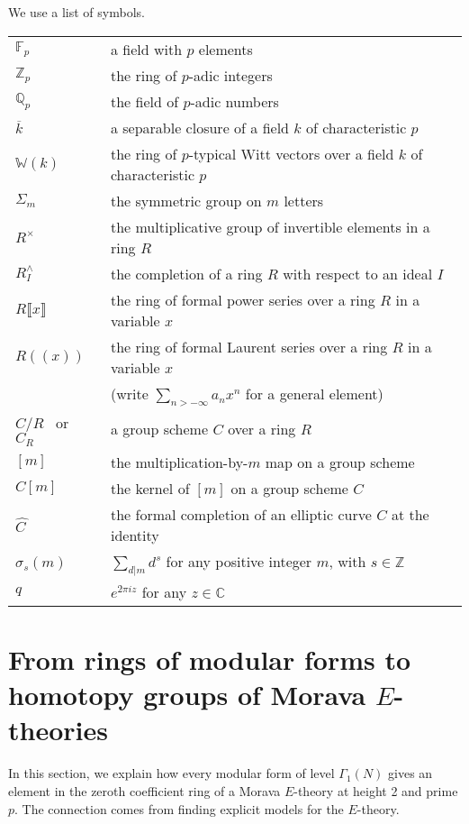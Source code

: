 \documentclass{gtpart}
\theoremstyle{definition}
\theoremstyle{remark}
\newcommand{\mb}[1]{\mathbb{#1}}
\newcommand{\BC}{{\mb C}}
\newcommand{\BF}{{\mb F}}
\newcommand{\BQ}{{\mb Q}}
\newcommand{\BW}{{\mb W}}
\newcommand{\BZ}{{\mb Z}}
\newcommand{\HC}{\widehat{C~}\!}
\newcommand{\G}{\Gamma}
\newcommand{\si}{\sigma}
\newcommand{\lb}{\llbracket}
\newcommand{\rb}{\rrbracket}
\renewcommand{\=}{\approx}
\renewcommand{\-}{\sim}
\numberwithin{equation}{section}
\numberwithin{thm}{section}
\begin{document}
We use a list of symbols.  
\begin{center}
\begin{tabular}{ll}
 $\BF_p$ & a field with $p$ elements \\
 $\BZ_p$ & the ring of $p$-adic integers \\
 $\BQ_p$ & the field of $p$-adic numbers \\
 $\overline{k}$ & a separable closure of a field $k$ of characteristic $p$ \\
 $\BW(k)$ & the ring of $p$-typical Witt vectors over a field $k$ of characteristic $p$ \\
 $\Sigma_m$ & the symmetric group on $m$ letters \\
 $R^\times$ & the multiplicative group of invertible elements in a ring $R$ \\
 $R_I^\wedge$ & the completion of a ring $R$ with respect to an ideal $I$ \\
 $R\lb x \rb$ & the ring of formal power series over a ring $R$ in a variable $x$ \\
 $R(\!(x)\!)$ & the ring of formal Laurent series over a ring $R$ in a variable $x$ \\
              & (write $\sum_{n > -\infty} a_n x^n$ for a general element) \\
 $C/R$ \, or \, $C_R$ & a group scheme $C$ over a ring $R$ \\
 $[m]$ & the multiplication-by-$m$ map on a group scheme \\
 $C[m]$ & the kernel of $[m]$ on a group scheme $C$ \\
 $\HC$ & the formal completion of an elliptic curve $C$ at the identity \\
 $\si_s(m)$ & $\sum_{d|m} d^s$ for any positive integer $m$, with $s \in \BZ$ \\
 $q$ & $e^{2 \pi i z}$ for any $z \in \BC$ 
\end{tabular}
\end{center}



\section{From rings of modular forms to homotopy groups of Morava $E$-theories}
\label{sec:mf2E}

In this section, we explain how every modular form of level $\G_1(N)$ gives an element in 
the zeroth coefficient ring of a Morava $E$-theory at height 2 and prime $p$.  The connection comes from finding explicit models for the $E$-theory.  
\end{document}
